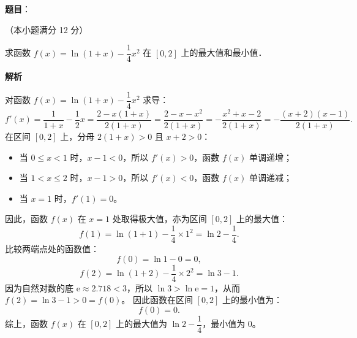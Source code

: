 \begin{answer}

\textbf{题目}：

（本小题满分 12 分）

求函数 $f(x)=\ln(1+x)-\dfrac{1}{4}x^2$ 在 $[0,2]$ 上的最大值和最小值．

\textbf{解析}

对函数 $f(x)=\ln(1+x)-\dfrac{1}{4}x^2$ 求导：
\nopagebreak[4]
\[
f'(x)=\frac{1}{1+x}-\frac{1}{2}x=\frac{2-x(1+x)}{2(1+x)}=\frac{2-x-x^2}{2(1+x)}=-\frac{x^2+x-2}{2(1+x)}=-\frac{(x+2)(x-1)}{2(1+x)}.
\]
在区间 $[0,2]$ 上，分母 $2(1+x)>0$ 且 $x+2>0$：
\begin{itemize}
\item 当 $0\leqslant x<1$ 时，$x-1<0$，所以 $f'(x)>0$，函数 $f(x)$ 单调递增；
\item 当 $1<x\leqslant 2$ 时，$x-1>0$，所以 $f'(x)<0$，函数 $f(x)$ 单调递减；
\item 当 $x=1$ 时，$f'(1)=0$。
\end{itemize}
因此，函数 $f(x)$ 在 $x=1$ 处取得极大值，亦为区间 $[0,2]$ 上的最大值：
\nopagebreak[4]
\[
f(1)=\ln(1+1)-\frac{1}{4}\times 1^2=\ln 2-\frac{1}{4}.
\]
比较两端点处的函数值：
\nopagebreak[4]
\[
f(0)=\ln 1-0=0,
\]
\nopagebreak[4]
\[
f(2)=\ln(1+2)-\frac{1}{4}\times 2^2=\ln 3-1.
\]
因为自然对数的底 $\mathrm{e}\approx 2.718<3$，所以 $\ln 3>\ln\mathrm{e}=1$，从而 $f(2)=\ln 3-1>0=f(0)$。
因此函数在区间 $[0,2]$ 上的最小值为：
\nopagebreak[4]
\[
f(0)=0.
\]
综上，函数 $f(x)$ 在 $[0,2]$ 上的最大值为 $\ln 2-\dfrac{1}{4}$，最小值为 0。


\end{answer}
